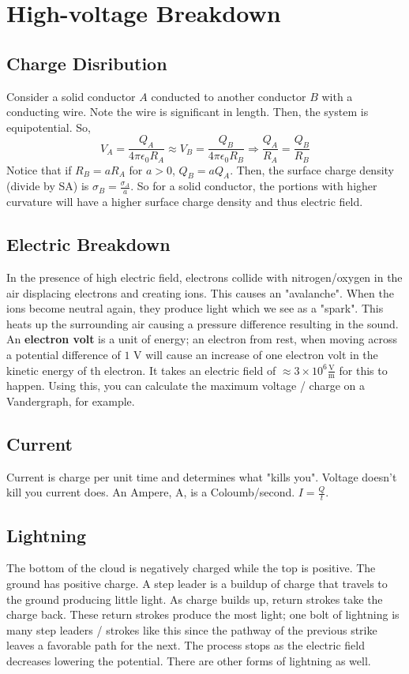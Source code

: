 \documentclass{article}
\begin{document}
\section{High-voltage Breakdown}
\subsection{Charge Disribution}
Consider a solid conductor $A$ conducted to another conductor $B$ with a conducting wire.
Note the wire is significant in length. Then, the system is equipotential. So,
$$V_{A}=\frac{Q_{A}}{4\pi\epsilon_{0}R_{A}}\approx V_{B}=\frac{Q_{B}}{4\pi\epsilon_{0}R_{B}}
\Rightarrow \frac{Q_{A}}{R_{A}}=\frac{Q_{B}}{R_{B}}$$
Notice that if $R_{B}=aR_{A}$ for $a > 0$, $Q_{B}=aQ_{A}$. Then, the surface charge density (divide by SA)
is $\sigma_{B}=\frac{\sigma_{A}}{a}$. So for a solid conductor, the portions with higher curvature will have
a higher surface charge density and thus electric field.

\subsection{Electric Breakdown}
In the presence of high electric field, electrons collide with nitrogen/oxygen in the air displacing electrons
and creating ions. This causes an "avalanche". When the ions become neutral again, they produce light which we see
as a "spark". This heats up the surrounding air causing a pressure difference resulting in the sound.
An \textbf{electron volt} is a unit of energy; an electron from rest, when moving across a potential
difference of $1\text{ V}$ will cause an increase of one electron volt in the kinetic energy of th electron.
It takes an electric field of $\approx 3\times 10^{6}\frac{\text{V}}{\text{m}}$ for this to happen.
Using this, you can calculate the maximum voltage / charge on a Vandergraph, for example. 

\subsection{Current}
Current is charge per unit time and determines what "kills you". Voltage doesn't kill you current does.
An Ampere, A, is a Coloumb/second. $I=\frac{Q}{t}$.

\subsection{Lightning}
The bottom of the cloud is negatively charged while the top is positive. The ground has positive charge. A step leader
is a buildup of charge that travels to the ground producing little light. As charge builds up, 
return strokes take the charge back. These return strokes produce the most light; one bolt of lightning is many step leaders / strokes
like this since the pathway of the previous strike leaves a favorable path for the next. The process stops 
as the electric field decreases lowering the potential. There are other forms of lightning as well.
\end{document}
